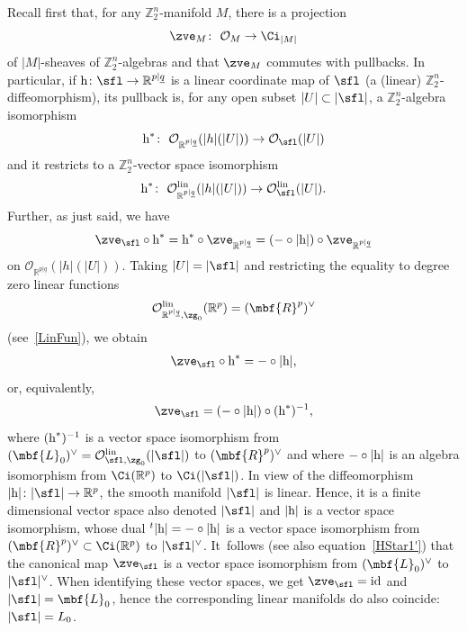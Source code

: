 \documentclass[pdftex]{sigma}%
\newcommand{\rmh}{\textnormal{h}}
\newcommand{\op}[1]{\operatorname{#1}}
\newcommand{\R}{{\mathbb R}}
\newcommand{\Z}{{\mathbb Z}}
\def\ul{\underline}
\def\cO{\mathcal{O}}
\def\ul{\underline}
\newcommand{\0}{\otimes}
\newcommand{\id}{\op{id}}
\newcommand{\z}{\Z_2^n}
\numberwithin{equation}{section}
\begin{document}
Recall first that, for any $\z$-manifold $M$, there is a projection
\[
\zve_M\colon\ \cO_{M}\to\Ci_{|M|}
\]
of $|M|$-sheaves of $\z$-algebras and that $\zve_M$ commutes with pullbacks. In particular, if $\rmh\colon \sfl\to\R^{p|\ul q}$ is a linear coordinate map of $\sfl$ (a (linear) $\z$-diffeomorphism), its pullback is, for any open subset $|U|\subset|\sfl|$, a $\z$-algebra isomorphism
\[
\rmh^*\colon\ \cO_{\R^{p|\ul q}}(|h|(|U|))\to \cO_\sfl(|U|)
\]
and it restricts to a $\z$-vector space isomorphism
\[
\rmh^*\colon\ \cO^{\op{lin}}_{\R^{p|\ul q}}(|h|(|U|))\to \cO^{\op{lin}}_\sfl(|U|).
\]
Further, as just said, we have
\[
\zve_\sfl\circ \rmh^*=\rmh^*\circ\zve_{\R^{p|\ul q}}=(-\circ|\rmh|)\circ\zve_{\R^{p|\ul q}}
\]
on $\cO_{\R^{p|\ul q}}(|h|(|U|))$. Taking $|U|=|\sfl|$ and restricting the equality to degree zero linear functions
\[
\cO_{\R^{p|\ul q},\zg_0}^{\op{lin}}(\R^p)=(\mbf{R}^{p})^\vee
\]
(see~\eqref{LinFun}), we obtain
\begin{gather}\label{HStar1}
\zve_\sfl\circ\rmh^*=-\circ|\rmh|,
\end{gather}
or, equivalently,
\begin{gather}\label{HStar1'}
\zve_\sfl=(-\circ|\rmh|)\circ(\rmh^*)^{-1},
\end{gather}
where $(\rmh^*)^{-1}$ is a vector space isomorphism from $(\mbf{L}_0)^\vee=\cO_{\sfl,\zg_0}^{\op{lin}}(|\sfl|)$ to $(\mbf{R}^p)^\vee$ and where $-\circ|\rmh|$ is an algebra isomorphism from $\Ci(\R^p)$ to $\Ci(|\sfl|)$. In view of the diffeomorphism $|\rmh|\colon |\sfl|\to \R^p$, the smooth manifold $|\sfl|$ is linear. Hence, it is a finite dimensional vector space also denoted $|\sfl|$ and $|\rmh|$ is a vector space isomorphism, whose dual $^t|\rmh|=-\circ|\rmh|$ is a vector space isomorphism from $(\mbf{R}^p)^\vee\subset\Ci(\R^p)$ to $|\sfl|^{\vee}$. It~follows (see also equation~\eqref{HStar1'}) that the canonical map $\zve_\sfl$ is a vector space isomorphism from $(\mbf{L}_0)^\vee$ to $|\sfl|^\vee$. When identifying these vector spaces, we get $\zve_\sfl=\id$ and $|\sfl|=\mbf{L}_0$, hence the corresponding linear manifolds do also coincide: $|\sfl|=L_0$.
\end{document}

